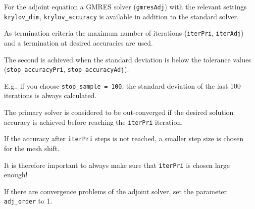 \documentclass[a4paper,oneside]{book}
\numberwithin{equation}{section}
\begin{document}
For the adjoint equation a GMRES solver (\texttt{gmresAdj}) with the relevant settings \verb|krylov_dim|, \verb|krylov_accuracy| is available in addition to the standard solver.

As termination criteria the maximum number of iterations (\texttt{iterPri}, \texttt{iterAdj}) and a termination at desired accuracies are used.

The second is achieved when the standard deviation is below the tolerance values (\verb|stop_accuracyPri|, \verb|stop_accuracyAdj|).

E.g., if you choose \verb|stop_sample = 100|, the standard deviation of the last 100 iterations is always calculated.

The primary solver is considered to be out-converged if the desired solution accuracy is achieved before reaching the \texttt{iterPri} iteration.

If the accuracy after \texttt{iterPri} steps is not reached, a smaller step size is chosen for the mesh shift.

It is therefore important to always make sure that \texttt{iterPri} is chosen large enough!

If there are convergence problems of the adjoint solver, set the parameter \verb|adj_order| to 1.
\end{document}
